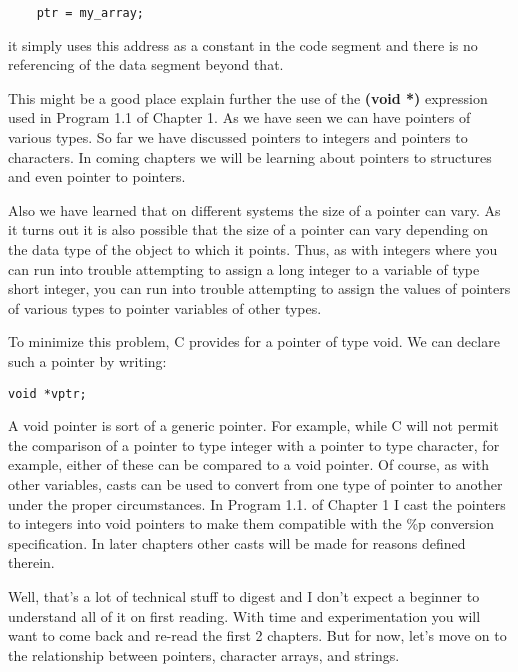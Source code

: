 \begin{verbatim}
    ptr = my_array;
\end{verbatim}

it simply uses this address as a constant in the code segment and there
is no referencing of the data segment beyond that.

This might be a good place explain further the use of the \textbf{(void
*)} expression used in Program 1.1 of Chapter 1. As we have seen we can
have pointers of various types. So far we have discussed pointers to
integers and pointers to characters. In coming chapters we will be
learning about pointers to structures and even pointer to pointers.

Also we have learned that on different systems the size of a pointer can
vary. As it turns out it is also possible that the size of a pointer can
vary depending on the data type of the object to which it points. Thus,
as with integers where you can run into trouble attempting to assign a
long integer to a variable of type short integer, you can run into
trouble attempting to assign the values of pointers of various types to
pointer variables of other types.

To minimize this problem, C provides for a pointer of type void. We can
declare such a pointer by writing:

\begin{verbatim}
void *vptr;
\end{verbatim}

A void pointer is sort of a generic pointer. For example, while C will
not permit the comparison of a pointer to type integer with a pointer to
type character, for example, either of these can be compared to a void
pointer. Of course, as with other variables, casts can be used to
convert from one type of pointer to another under the proper
circumstances. In Program 1.1. of Chapter 1 I cast the pointers to
integers into void pointers to make them compatible with the \%p
conversion specification. In later chapters other casts will be made for
reasons defined therein.

Well, that's a lot of technical stuff to digest and I don't expect a
beginner to understand all of it on first reading. With time and
experimentation you will want to come back and re-read the first 2
chapters. But for now, let's move on to the relationship between
pointers, character arrays, and strings.

\begin{comment}
\href{ch3x.htm}{Chapter 3: Pointers and Strings}

\href{pointers.htm}{Back to Table of Contents}
\end{comment}
